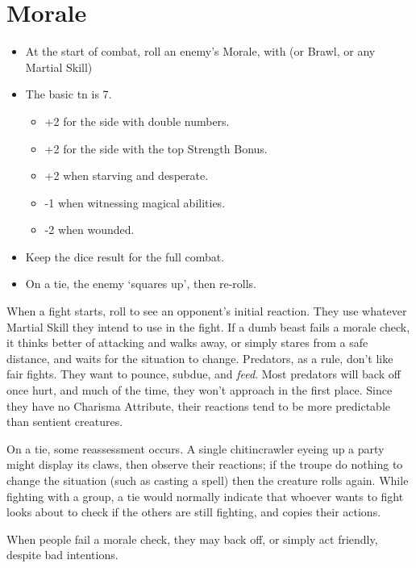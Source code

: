 \section{Morale}
\label{morale}
\begin{multicols}{2}

\begin{itemize}
  \item
  At the start of combat, roll an enemy's Morale, with  (or Brawl, or any Martial Skill)
  \item
  The basic \gls{tn} is 7.
  \begin{itemize}
    \item
    +2 for the side with double numbers.
    \item
    +2 for the side with the top Strength Bonus.
    \item
    +2 when starving and desperate.
    \item
    -1 when witnessing magical abilities.
    \item
    -2 when wounded.
  \end{itemize}
  \item
  Keep the dice result for the full combat.
  \item
  On a tie, the enemy `squares up', then re-rolls.
\end{itemize}

\noindent
When a fight starts, roll to see an opponent's initial reaction.
They use whatever Martial Skill they intend to use in the fight.
If a dumb beast fails a morale check, it thinks better of attacking and walks away, or simply stares from a safe distance, and waits for the situation to change.
Predators, as a rule, don't like fair fights.
They want to pounce, subdue, and \emph{feed}.
Most predators will back off once hurt, and much of the time, they won't approach in the first place.
Since they have no Charisma Attribute, their reactions tend to be more predictable than sentient creatures.

On a tie, some reassessment occurs.
A single chitincrawler eyeing up a party might display its claws, then observe their reactions; if the troupe do nothing to change the situation (such as casting a spell) then the creature rolls again.
While fighting with a group, a tie would normally indicate that whoever wants to fight looks about to check if the others are still fighting, and copies their actions.

When people fail a morale check, they may back off, or simply act friendly, despite bad intentions.


\end{multicols}
